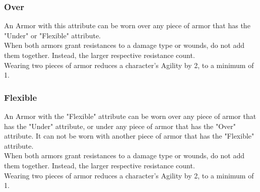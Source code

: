 \subsubsection{Over}
An Armor with this attribute can be worn over any piece of armor that has the "Under" or "Flexible" attribute.\\
When both armors grant resistances to a damage type or wounds, do not add them together. Instead, the larger respective resistance count.\\
Wearing two pieces of armor reduces a character's Agility by 2, to a minimum of 1.

\subsubsection{Flexible}
An Armor with the "Flexible" attribute can be worn over any piece of armor that has the "Under" attribute, or under any piece of armor that has the "Over" attribute. It can not be worn with another piece of armor that has the "Flexible" attribute.\\
When both armors grant resistances to a damage type or wounds, do not add them together. Instead, the larger respective resistance count.\\
Wearing two pieces of armor reduces a character's Agility by 2, to a minimum of 1.